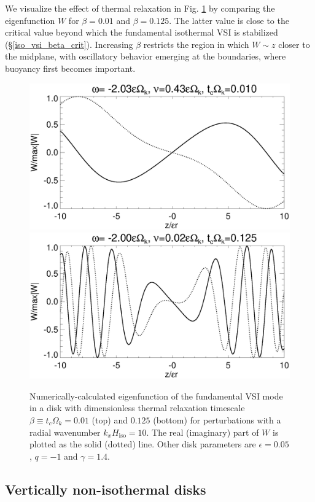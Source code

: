 We visualize the effect of thermal relaxation in 
Fig. \ref{relax_eigenW_num} by comparing the eigenfunction $W$ for
$\beta=0.01$ and $\beta=0.125$. The latter value is close to the critical
value beyond which the fundamental isothermal VSI is stabilized
(\S\ref{iso_vsi_beta_crit}).  Increasing $\beta$ restricts 
the region in which $W\sim z$ closer to the midplane, with oscillatory
behavior emerging at the boundaries, where buoyancy first becomes
important.  

\begin{figure}
  \includegraphics[width=\linewidth,clip=true,trim=0cm 1.75cm 0cm 0cm]{figures/eigenvectorW_beta0d01}
  \includegraphics[width=\linewidth,clip=true,trim=0cm 0cm 0cm 0cm]{figures/eigenvectorW_beta0d125}
  \caption{Numerically-calculated eigenfunction of the fundamental VSI
    mode in a disk with dimensionless thermal relaxation timescale
    $\beta \equiv t_c\Omega_k = 0.01$ (top) and $0.125$ (bottom) for
    perturbations with a radial wavenumber $k_xH_\mathrm{iso}=10$. The
    real (imaginary) part of $W$ is plotted as the solid (dotted)
    line. Other disk parameters are
    $\epsilon=0.05$, $q=-1$ and $\gamma=1.4$.
    \label{relax_eigenW_num}}  
\end{figure}


\subsection{Vertically non-isothermal disks}

